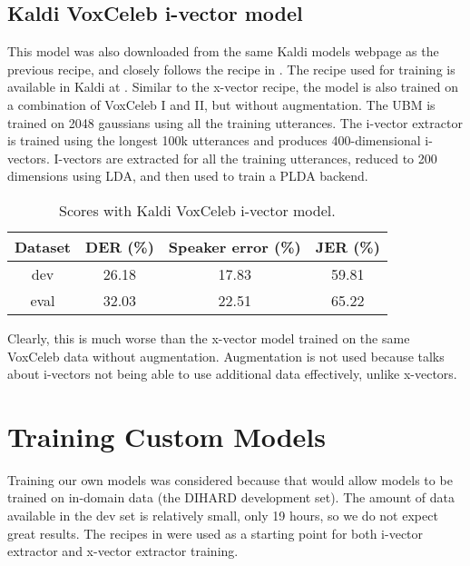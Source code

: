 		\subsection{Kaldi VoxCeleb i-vector model}
			This model was also downloaded from the same Kaldi models webpage as the previous recipe, and closely follows the recipe in \cite{snyder2018x}. The recipe used for training is available in Kaldi at . Similar to the x-vector recipe, the model is also trained on a combination of VoxCeleb I and II, but without augmentation. The UBM is trained on 2048 gaussians using all the training utterances. The i-vector extractor is trained using the longest 100k utterances and produces 400-dimensional i-vectors. I-vectors are extracted for all the training utterances, reduced to 200 dimensions using LDA, and then used to train a PLDA backend.
			
			\begin{table}[h]
				\centering
				\begin{tabular}{|c|c|c|c|}
					\hline
					Dataset & DER (\%) & Speaker error (\%) & JER (\%) \\
					\hline
					dev & 26.18 & 17.83 & 59.81 \\
					\hline
					eval & 32.03 & 22.51 & 65.22 \\
					\hline
				\end{tabular}
				\caption{Scores with Kaldi VoxCeleb i-vector model.}
			\end{table}
		
		Clearly, this is much worse than the x-vector model trained on the same VoxCeleb data without augmentation. Augmentation is not used because \cite{snyder2018x} talks about i-vectors not being able to use additional data effectively, unlike x-vectors.
	
	\section{Training Custom Models}
	Training our own models was considered because that would allow models to be trained on in-domain data (the DIHARD development set). The amount of data available in the dev set is relatively small, only 19 hours, so we do not expect great results. The recipes in  were used as a starting point for both i-vector extractor and x-vector extractor training.
	
